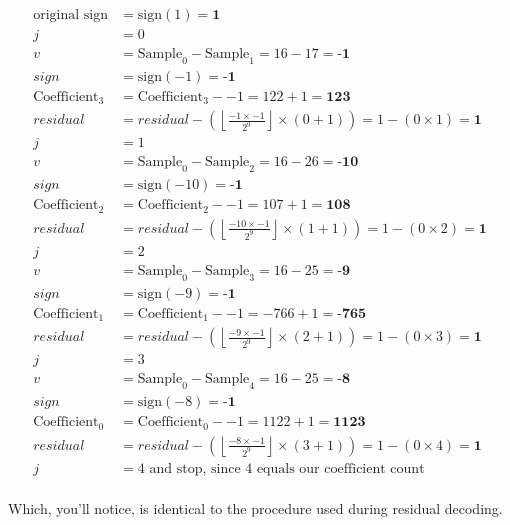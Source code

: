 {
\begin{align*}
\text{original sign} &= \text{sign}(1) = \textbf{1} \\
j &= 0 \\
v &= \text{Sample}_0 - \text{Sample}_{1} = 16 - 17 = \textbf{-1} \\
sign &= \text{sign}(-1) = \textbf{-1} \\
\text{Coefficient}_3 &= \text{Coefficient}_3 - -1 = 122 + 1 = \textbf{123} \\
residual &= residual - \left( \left\lfloor\frac{-1 \times -1}{2 ^ 9}\right\rfloor \times (0 + 1)\right) = 1 - (0 \times 1) = \textbf{1} \\
j &= 1 \\
v &= \text{Sample}_0 - \text{Sample}_{2} = 16 - 26 = \textbf{-10} \\
sign &= \text{sign}(-10) = \textbf{-1} \\
\text{Coefficient}_2 &= \text{Coefficient}_2 - -1 = 107 + 1 = \textbf{108} \\
residual &= residual - \left( \left\lfloor\frac{-10 \times -1}{2 ^ 9}\right\rfloor \times (1 + 1)\right) = 1 - (0 \times 2) = \textbf{1} \\
j &= 2 \\
v &= \text{Sample}_0 - \text{Sample}_{3} = 16 - 25 = \textbf{-9} \\
sign &= \text{sign}(-9) = \textbf{-1} \\
\text{Coefficient}_1 &= \text{Coefficient}_1 - -1 = -766 + 1 = \textbf{-765} \\
residual &= residual - \left( \left\lfloor\frac{-9 \times -1}{2 ^ 9}\right\rfloor \times (2 + 1)\right) = 1 - (0 \times 3) = \textbf{1} \\
j &= 3 \\
v &= \text{Sample}_0 - \text{Sample}_{4} = 16 - 25 = \textbf{-8} \\
sign &= \text{sign}(-8) = \textbf{-1} \\
\text{Coefficient}_0 &= \text{Coefficient}_0 - -1 = 1122 + 1 = \textbf{1123} \\
residual &= residual - \left( \left\lfloor\frac{-8 \times -1}{2 ^ 9}\right\rfloor \times (3 + 1)\right) = 1 - (0 \times 4) = \textbf{1} \\
j &= 4\text{ and stop, since 4 equals our coefficient count} \\
\end{align*}
}
\par
Which, you'll notice, is identical to the procedure used during
residual decoding.

